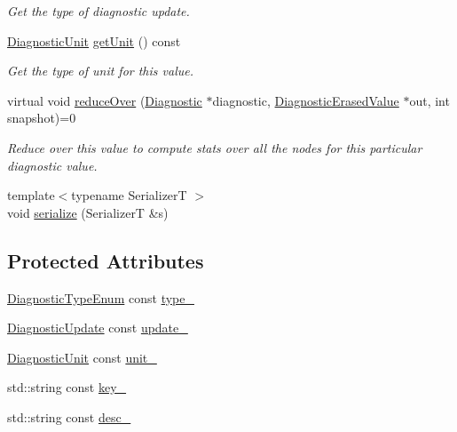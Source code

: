 \begin{DoxyCompactItemize}
\begin{DoxyCompactList}\small\item\em Get the type of diagnostic update. \end{DoxyCompactList}\item 
\hyperlink{namespacevt_1_1runtime_1_1component_a99ec18b08862c712176126bb7d0e307a}{Diagnostic\+Unit} \hyperlink{structvt_1_1runtime_1_1component_1_1detail_1_1_diagnostic_base_aae529e6a682145fa59f90bcea0d5e6d8}{get\+Unit} () const
\begin{DoxyCompactList}\small\item\em Get the type of unit for this value. \end{DoxyCompactList}\item 
virtual void \hyperlink{structvt_1_1runtime_1_1component_1_1detail_1_1_diagnostic_base_a3a47051d20b9c7c66146eeda75fd7ad6}{reduce\+Over} (\hyperlink{structvt_1_1runtime_1_1component_1_1_diagnostic}{Diagnostic} $\ast$diagnostic, \hyperlink{structvt_1_1runtime_1_1component_1_1_diagnostic_erased_value}{Diagnostic\+Erased\+Value} $\ast$out, int snapshot)=0
\begin{DoxyCompactList}\small\item\em Reduce over this value to compute stats over all the nodes for this particular diagnostic value. \end{DoxyCompactList}\item 
{\footnotesize template$<$typename SerializerT $>$ }\\void \hyperlink{structvt_1_1runtime_1_1component_1_1detail_1_1_diagnostic_base_a7954f310c9189c4d6ff43f7d0029a98f}{serialize} (SerializerT \&s)
\end{DoxyCompactItemize}
\subsection*{Protected Attributes}
\begin{DoxyCompactItemize}
\item 
\hyperlink{namespacevt_1_1runtime_1_1component_af0bb99d9a054682217874bdc735ecac0}{Diagnostic\+Type\+Enum} const \hyperlink{structvt_1_1runtime_1_1component_1_1detail_1_1_diagnostic_base_a3ec20887005eeff64bc9b5ff11b4660b}{type\+\_\+}
\item 
\hyperlink{namespacevt_1_1runtime_1_1component_a896637e6e183a909a17bfd8d3943c206}{Diagnostic\+Update} const \hyperlink{structvt_1_1runtime_1_1component_1_1detail_1_1_diagnostic_base_ad3cde52b9fbd10f4c5de29ce2d4878f3}{update\+\_\+}
\item 
\hyperlink{namespacevt_1_1runtime_1_1component_a99ec18b08862c712176126bb7d0e307a}{Diagnostic\+Unit} const \hyperlink{structvt_1_1runtime_1_1component_1_1detail_1_1_diagnostic_base_a2e77691cce01c69757483f4cdca65b19}{unit\+\_\+}
\item 
std\+::string const \hyperlink{structvt_1_1runtime_1_1component_1_1detail_1_1_diagnostic_base_a9933513cdc0b6cb0b05e453e31d8719a}{key\+\_\+}
\item 
std\+::string const \hyperlink{structvt_1_1runtime_1_1component_1_1detail_1_1_diagnostic_base_a1c70c4da286b442bf1dd0285f5c10fb3}{desc\+\_\+}
\end{DoxyCompactItemize}



